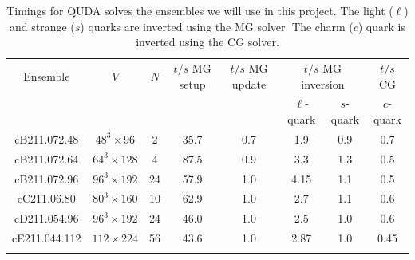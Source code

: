 \begin{table}%
	\centering %
	\begin{tabular}{cccccccc} %
		\toprule
		Ensemble      & $V$             & $N$ & $t/s$ MG setup & $t/s$ MG update & \multicolumn{2}{c}{$t/s$ MG inversion} & $t/s$ CG              \\
		              &                 &     &                &                 & $\ell$-quark                           & $s$-quark & $c$-quark \\
		\midrule
		\midrule
		cB211.072.48  & $48^3\times96$  & 2   & 35.7           & 0.7             & 1.9                                    & 0.9       & 0.7       \\
		cB211.072.64  & $64^3\times128$ & 4   & 87.5           & 0.9             & 3.3                                    & 1.3       & 0.5       \\
		cB211.072.96  & $96^3\times192$ & 24  & 57.9           & 1.0             & 4.15                                   & 1.1       & 0.5       \\
		\midrule
		cC211.06.80   & $80^3\times160$ & 10  & 62.9           & 1.0             & 2.7                                    & 1.1       & 0.6       \\
		\midrule
		cD211.054.96  & $96^3\times192$ & 24  & 46.0           & 1.0             & 2.5                                    & 1.0       & 0.6       \\
		\midrule
		cE211.044.112 & $112\times224$  & 56  & 43.6           & 1.0             & 2.87                                   & 1.0       & 0.45      \\
		\bottomrule   &
	\end{tabular}
	\caption{Timings for QUDA solves the ensembles we will use in this project.
		The light ($\ell$) and strange ($s$) quarks are inverted using the MG solver.
		The charm ($c$) quark is inverted using the CG solver.
	}
	\label{tab:MGsolver}
\end{table}

